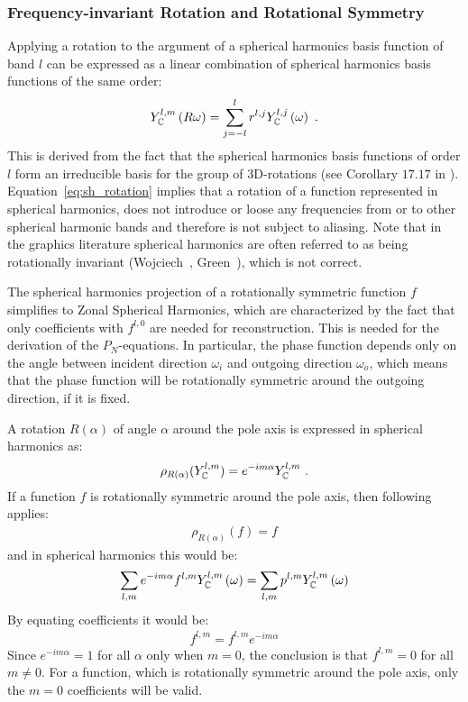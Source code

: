 \subsubsection*{Frequency-invariant Rotation and Rotational Symmetry}

Applying a rotation to the argument of a spherical harmonics basis function of band $l$ can be expressed as a linear combination of spherical harmonics basis functions of the same order:
\begin{align}
\label{eq:sh_rotation}
Y_{\mathbb{C}}^{l,m}\left(R\omega\right)=\sum_{j=-l}^{l}r^{l,j}Y_{\mathbb{C}}^{l,j}\left(\omega\right)
\ .
\end{align}
This is derived from the fact that the spherical harmonics basis functions of order $l$ form an irreducible basis for the group of 3D-rotations (see Corollary $17.17$ in \cite{Hall13}). Equation~\ref{eq:sh_rotation} implies that a rotation of a function represented in spherical harmonics, does not introduce or loose any frequencies from or to other spherical harmonic bands and therefore is not subject to aliasing. Note that in the graphics literature spherical harmonics are often referred to as being rotationally invariant (Wojciech~\cite{Wojciech08}, Green~\cite{Green03}), which is not correct.

The spherical harmonics projection of a rotationally symmetric function $f$ simplifies to Zonal Spherical Harmonics, which are characterized by the fact that only coefficients with $f^{l,0}$ are needed for reconstruction. This is needed for the derivation of the $P_N$-equations. In particular, the phase function depends only on the angle between incident direction $\omega_i$ and outgoing direction $\omega_o$, which means that the phase function will be rotationally symmetric around the outgoing direction, if it is fixed. 

A rotation $R(\alpha)$ of angle $\alpha$ around the pole axis is expressed in spherical harmonics as:
\begin{align*}
\rho_{R(\alpha)}(Y_{\mathbb{C}}^{l,m}) = e^{-i m\alpha}Y_{\mathbb{C}}^{l,m}
\ .
\end{align*}
If a function $f$ is rotationally symmetric around the pole axis, then following applies:
\begin{align*}
\rho_{R(\alpha)}(f) = f
\end{align*}
and in spherical harmonics this would be:
\begin{align*}
\sum_{l,m}
{
e^{-i m\alpha}
f^{l,m}
Y_{\mathbb{C}}^{l,m} }\left(\omega\right)
=
\sum_{l,m}
{
p^{l,m}
Y_{\mathbb{C}}^{l,m}\left(\omega\right)
}
\end{align*}
By equating coefficients it would be:
\begin{align*}
f^{l,m} = f^{l,m}e^{-i m\alpha}
\end{align*}
Since $e^{-i m\alpha}=1$ for all $\alpha$ only when $m=0$, the conclusion is that $f^{l,m} = 0$ for all $m\ne0$. For a function, which is rotationally symmetric around the pole axis, only the $m=0$ coefficients will be valid.


